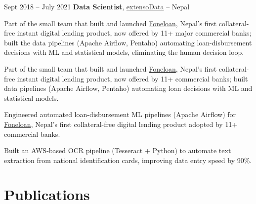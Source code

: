         \vspace{0.12 cm}
        \begin{twocolentry}{
            Sept 2018 – July 2021
        }
            \textbf{Data Scientist}, \href{https://www.extensodata.com/}{extensoData} -- Nepal\end{twocolentry}
        \vspace{0.06 cm}
        \begin{onecolentry}
            \begin{highlights}
                \item Part of the small team that built and launched \href{https://foneloan.com.np/}{Foneloan}, Nepal's first collateral-free instant digital lending product, now offered by 11+ major commercial banks; built the data pipelines (Apache Airflow, Pentaho) automating loan-disbursement decisions with ML and statistical models, eliminating the human decision loop.
                \item Part of the small team that built and launched \href{https://foneloan.com.np/}{Foneloan}, Nepal's first collateral-free instant digital lending product, now offered by 11+ commercial banks; built data pipelines (Apache Airflow, Pentaho) automating loan decisions with ML and statistical models.
                \item Engineered automated loan-disbursement ML pipelines (Apache Airflow) for \href{https://foneloan.com.np/}{Foneloan}, Nepal's first collateral-free digital lending product adopted by 11+ commercial banks.
                \item Built an AWS-based OCR pipeline (Tesseract + Python) to automate text extraction from national identification cards, improving data entry speed by 90\%.
            \end{highlights}
        \end{onecolentry}

    \section{Publications}

